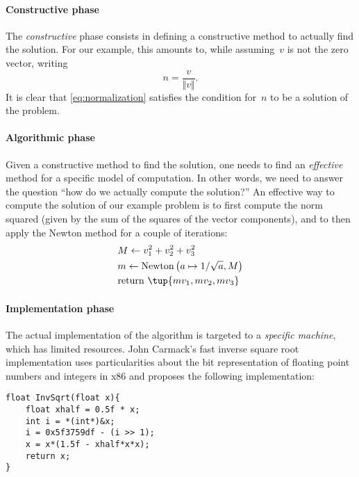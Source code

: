 \paragraph*{Constructive phase}
The \emph{constructive} phase consists in defining a constructive method to actually find the solution.
For our example, this amounts to, while assuming~$v$ is not the zero vector, writing
\begin{equation}
    \label{eq:normalization}
    n=\frac{v}{\Vert v \Vert}.
\end{equation}
It is clear that \cref{eq:normalization} satisfies the condition for~$n$ to be a solution of the problem.
\paragraph*{Algorithmic phase}
Given a constructive method to find the solution, one needs to find an \emph{effective} method for a specific model of computation.
In other words, we need to answer the question ``how do we actually compute the solution?''
An effective way to compute the solution of our example problem is to first compute the norm squared (given by the sum of the squares of the vector components), and to then apply the Newton method for a couple of iterations:
\begin{equation}
    \label{eq:newton_normalization}
    \begin{aligned}
        &M\leftarrow v_1^2+v_2^2+v_3^2\\
        &m\leftarrow \text{Newton}\left(a\mapsto 1/\sqrt{a},M\right)\\
        &\text{return }\tup{mv_1,mv_2,mv_3}
    \end{aligned}
\end{equation}
%

\paragraph*{Implementation phase}
The actual implementation of the algorithm is targeted to a \emph{specific machine}, which has limited resources.
John Carmack's fast inverse square root implementation uses particularities about the bit representation of floating point numbers and integers in x86 and proposes the following implementation:

\begin{center}
    \begin{verbatim}
float InvSqrt(float x){
    float xhalf = 0.5f * x;
    int i = *(int*)&x;
    i = 0x5f3759df - (i >> 1);
    x = x*(1.5f - xhalf*x*x);
    return x;
}
    \end{verbatim}
\end{center}

